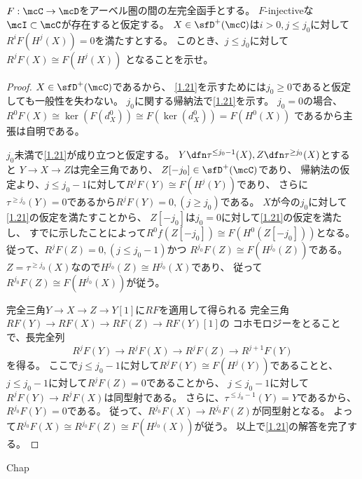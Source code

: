 \documentclass[uplatex,dvipdfmx]{jsarticle}
\begin{document}
\maketitle\HeaderCommentA
\section{}
\fi



\begin{prob}\label{1.21}
  \(F:\mcC\to\mcD\)をアーベル圏の間の左完全函手とする。
  \(F\)-injectiveな\(\mcI\subset \mcC\)が存在すると仮定する。
  \(X\in \sfD^+(\mcC)\)は\(i>0,j\leq j_0\)に対して
  \(R^iF(H^j(X)) = 0\)を満たすとする。
  このとき、\(j\leq j_0\)に対して\(R^jF(X) \cong F(H^j(X))\)
  となることを示せ。
\end{prob}

\begin{proof}
  \(X\in \sfD^+(\mcC)\)であるから、
  \autoref{1.21}を示すためには\(j_0 \geq 0\)であると仮定しても一般性を失わない。
  \(j_0\)に関する帰納法で\autoref{1.21}を示す。
  \(j_0=0\)の場合、
  \(R^0F(X)\cong \ker(F(d_X^0)) \cong F(\ker(d_X^0)) = F(H^0(X))\)
  であるから主張は自明である。

  \(j_0\)未満で\autoref{1.21}が成り立つと仮定する。
  \(Y\dfn \tau^{\leq j_0-1}(X), Z\dfn \tau^{\geq j_0}(X)\)とすると
  \(Y\to X\to Z\)は完全三角であり、
  \(Z[-j_0]\in \sfD^+(\mcC)\)であり、
  帰納法の仮定より、\(j\leq j_0-1\)に対して\(R^jF(Y) \cong F(H^j(Y))\)であり、
  さらに\(\tau^{\geq j_0}(Y) = 0\)であるから\(R^jF(Y) = 0, (j\geq j_0)\)である。
  \(X\)が今の\(j_0\)に対して\autoref{1.21}の仮定を満たすことから、
  \(Z[-j_0]\)は\(j_0=0\)に対して\autoref{1.21}の仮定を満たし、
  すでに示したことによって\(R^0f(Z[-j_0])\cong F(H^0(Z[-j_0]))\)となる。
  従って、\(R^jF(Z) = 0, (j \leq j_0-1)\)かつ
  \(R^{j_0}F(Z) \cong F(H^{j_0}(Z))\)である。
  \(Z = \tau^{\geq j_0}(X)\)なので\(H^{j_0}(Z) \cong H^{j_0}(X)\)であり、
  従って\(R^{j_0}F(Z) \cong F(H^{j_0}(X))\)が従う。

  完全三角\(Y\to X\to Z\to Y[1]\)に\(RF\)を適用して得られる
  完全三角\(RF(Y) \to RF(X) \to RF(Z)\to RF(Y)[1]\)の
  コホモロジーをとることで、長完全列
  \[
  R^jF(Y) \to R^jF(X) \to R^jF(Z) \to R^{j+1}F(Y)
  \]
  を得る。
  ここで\(j\leq j_0-1\)に対して\(R^jF(Y) \cong F(H^j(Y))\)であることと、
  \(j\leq j_0-1\)に対して\(R^jF(Z) = 0\)であることから、
  \(j\leq j_0-1\)に対して\(R^jF(Y)\to R^jF(X)\)は同型射である。
  さらに、\(\tau^{\leq j_0-1}(Y) = Y\)であるから、
  \(R^{j_0}F(Y) = 0\)である。
  従って、\(R^{j_0}F(X)\to R^{j_0}F(Z)\)が同型射となる。
  よって\(R^{j_0}F(X)\cong R^{j_0}F(Z) \cong F(H^{j_0}(X))\)が従う。
  以上で\autoref{1.21}の解答を完了する。
\end{proof}







\ifcsname Chap\endcsname\else
\printbibliography
\end{document}
